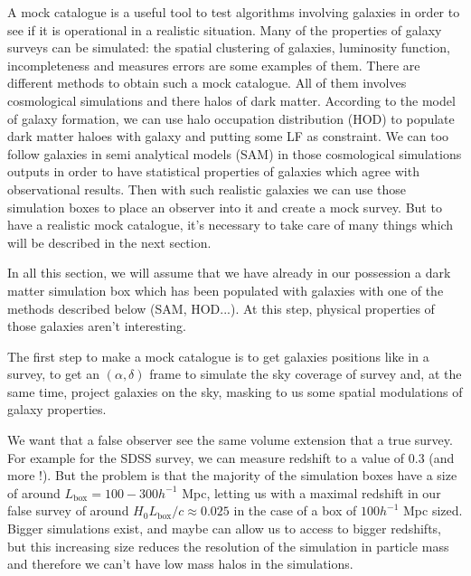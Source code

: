 


A mock catalogue is a useful tool to test algorithms involving galaxies in order to see if it
is operational in a realistic situation. Many of the properties of galaxy surveys can be simulated: the spatial clustering of
galaxies, luminosity function, incompleteness and measures errors are some examples of them. There are different methods to obtain
such a mock catalogue. All of them involves cosmological simulations and there halos of dark matter. According to the model of
galaxy formation, we can use halo occupation distribution (HOD) to populate dark matter haloes with galaxy and putting some LF as
constraint. We can too follow galaxies in semi analytical models (SAM) in those cosmological simulations outputs in order to have
statistical properties of galaxies which agree with observational results. Then with such realistic galaxies we can use those
simulation boxes to place an observer into it and create a mock survey. But to have a realistic mock catalogue, it's necessary to
take care of many things which will be described in the next section.


In all this section, we will assume that we have already in our possession a dark matter simulation box which has been populated
with galaxies with one of the methods described below (SAM, HOD...). At this step, physical properties of those galaxies aren't
interesting.


The first step to make a mock catalogue is to get galaxies positions like in a survey, to get an $(\alpha,\delta)$ frame to simulate
the sky coverage of survey and, at the same time, project galaxies on the sky, masking to us some spatial modulations of galaxy
properties.

We want that a false observer see the same volume extension that a true survey. For example for the SDSS survey, we can measure
redshift to a value of 0.3 (and more !). But the problem is that the majority of the simulation boxes have a size of around
$L_{\mathrm{box}}=\num{100}-\num{300} h^{-1}$ Mpc, letting us with a maximal redshift in our false survey of around
${H_0}{L_{\mathrm{box}}}/c\approx\num{0.025}$ in the case of a box of $\num{100} h^{-1}$ Mpc sized. Bigger simulations exist, and
maybe can allow us to access to bigger redshifts, but this increasing size reduces the resolution of the simulation in particle mass
and therefore we can't have low mass halos in the simulations.

